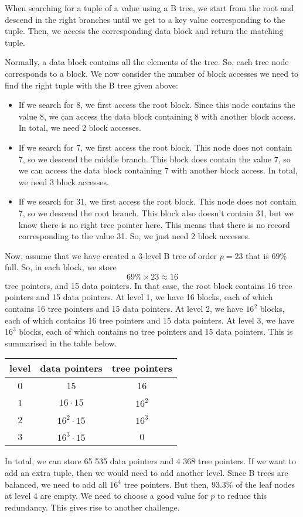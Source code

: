 \documentclass[a4paper, openany]{memoir}
\begin{document}
When searching for a tuple of a value using a B tree, we start from the root and descend in the right branches until we get to a key value corresponding to the tuple. Then, we access the corresponding data block and return the matching tuple. 

Normally, a data block contains all the elements of the tree. So, each tree node corresponds to a block. We now consider the number of block accesses we need to find the right tuple with the B tree given above:
\begin{itemize}
    \item If we search for 8, we first access the root block. Since this node contains the value 8, we can access the data block containing 8 with another block access. In total, we need 2 block accesses.
    \item If we search for 7, we first access the root block. This node does not contain 7, so we descend the middle branch. This block does contain the value 7, so we can access the data block containing 7 with another block access. In total, we need 3 block accesses.
    \item If we search for 31, we first access the root block. This node does not contain 7, so we descend the root branch. This block also doesn't contain 31, but we know there is no right tree pointer here. This means that there is no record corresponding to the value 31. So, we just need 2 block accesses.
\end{itemize}

Now, assume that we have created a 3-level B tree of order $p = 23$ that is $69\%$ full. So, in each block, we store
\[69\% \times 23 \approx 16\]
tree pointers, and 15 data pointers. In that case, the root block contains 16 tree pointers and 15 data pointers. At level 1, we have 16 blocks, each of which contains 16 tree pointers and 15 data pointers. At level 2, we have $16^2$ blocks, each of which contains 16 tree pointers and 15 data pointers. At level 3, we have $16^3$ blocks, each of which contains no tree pointers and 15 data pointers. This is summarised in the table below.
\begin{table}[H]
    \centering
    \begin{tabular}{|c|c|c|}
        \hline
        level & data pointers & tree pointers \\
        \hline
        0 & 15 & 16 \\
        1 & $16 \cdot 15$ & $16^2$ \\
        2 & $16^2 \cdot 15$ & $16^3$ \\
        3 & $16^3 \cdot 15$ & 0 \\
        \hline
    \end{tabular}
\end{table}
In total, we can store 65 535 data pointers and 4 368 tree pointers. If we want to add an extra tuple, then we would need to add another level. Since B trees are balanced, we need to add all $16^4$ tree pointers. But then, 93.3\% of the leaf nodes at level 4 are empty. We need to choose a good value for $p$ to reduce this redundancy. This gives rise to another challenge.
\end{document}

